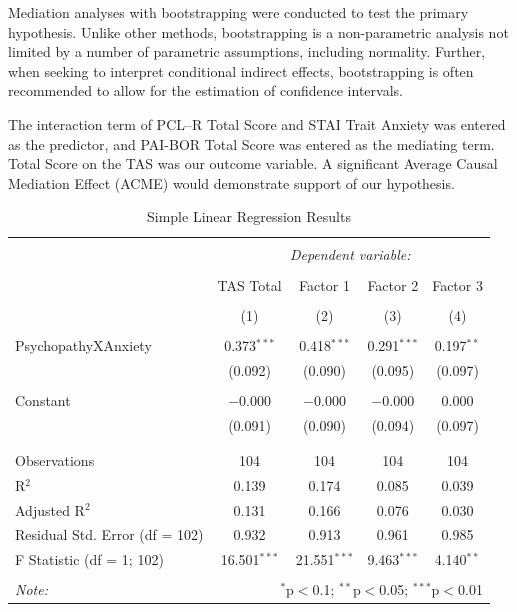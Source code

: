 \documentclass[
  man,floatsintext]{apa7}
\begin{document}
Mediation analyses with bootstrapping were conducted to test the primary hypothesis. Unlike other methods, bootstrapping is a non-parametric analysis not limited by a number of parametric assumptions, including normality. Further, when seeking to interpret conditional indirect effects, bootstrapping is often recommended to allow for the estimation of confidence intervals.

The interaction term of PCL--R Total Score and STAI Trait Anxiety was entered as the predictor, and PAI-BOR Total Score was entered as the mediating term. Total Score on the TAS was our outcome variable. A significant Average Causal Mediation Effect (ACME) would demonstrate support of our hypothesis.

\begin{table}[!htbp] \centering 
  \caption{Simple Linear Regression Results} 
  \label{tab:simple-regression-output} 
\begin{tabular}{@{\extracolsep{1pt}}lcccc} 
\\[-1.8ex]\hline 
\hline \\[-1.8ex] 
 & \multicolumn{4}{c}{\textit{Dependent variable:}} \\ 
\cline{2-5} 
\\[-1.8ex] & TAS Total & Factor 1 & Factor 2 & Factor 3 \\ 
\\[-1.8ex] & (1) & (2) & (3) & (4)\\ 
\hline \\[-1.8ex] 
 PsychopathyXAnxiety & 0.373$^{***}$ & 0.418$^{***}$ & 0.291$^{***}$ & 0.197$^{**}$ \\ 
  & (0.092) & (0.090) & (0.095) & (0.097) \\ 
  & & & & \\ 
 Constant & $-$0.000 & $-$0.000 & $-$0.000 & 0.000 \\ 
  & (0.091) & (0.090) & (0.094) & (0.097) \\ 
  & & & & \\ 
\hline \\[-1.8ex] 
Observations & 104 & 104 & 104 & 104 \\ 
R$^{2}$ & 0.139 & 0.174 & 0.085 & 0.039 \\ 
Adjusted R$^{2}$ & 0.131 & 0.166 & 0.076 & 0.030 \\ 
Residual Std. Error (df = 102) & 0.932 & 0.913 & 0.961 & 0.985 \\ 
F Statistic (df = 1; 102) & 16.501$^{***}$ & 21.551$^{***}$ & 9.463$^{***}$ & 4.140$^{**}$ \\ 
\hline 
\hline \\[-1.8ex] 
\textit{Note:}  & \multicolumn{4}{r}{$^{*}$p$<$0.1; $^{**}$p$<$0.05; $^{***}$p$<$0.01} \\ 
\end{tabular} 
\end{table}
\end{document}
